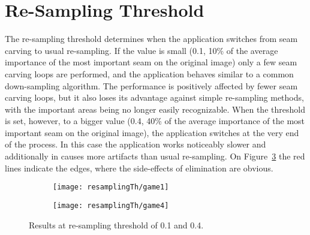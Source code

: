 \documentclass[draft,final]{vutinfth} %
\begin{document}
	\section{Re-Sampling Threshold}
	\label{res:resampling}
	The re-sampling threshold determines when the application switches from seam carving to usual re-sampling. 
	If the value is small (0.1, 10\% of the average importance of the most important seam on the original image) only a few seam carving loops are performed, and the application behaves similar to a common down-sampling algorithm.
	The performance is positively affected by fewer seam carving loops, but it also loses its advantage against simple re-sampling methods, with the important areas being no longer easily recognizable.
	When the threshold is set, however, to a bigger value (0.4, 40\% of the average importance of the most important seam on the original image), the application switches at the very end of the process.
	In this case the application works noticeably slower and additionally in causes more artifacts than usual re-sampling.
	On Figure~\ref{fig:res} the red lines indicate the edges, where the side-effects of elimination are obvious.
	\begin{figure}[H]
		\centering
		\begin{subfigure}[b]{0.45\columnwidth}
			\centering
			\texttt{[image: resamplingTh/game1]}
			\label{fig:res:th1}
		\end{subfigure}
		\begin{subfigure}[b]{0.45\columnwidth}
			\centering
			\texttt{[image: resamplingTh/game4]}
			\label{fig:res:th2}
		\end{subfigure}
		\caption{Results at re-sampling threshold of 0.1 and 0.4.}
		\label{fig:res}
	\end{figure}  
\end{document}
